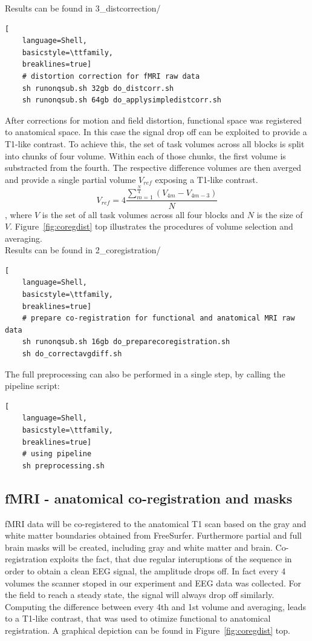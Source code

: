 \documentclass[12pt,a4paper]{scrartcl}
\begin{document}
\noindent Results can be found in 3\_distcorrection/\\
\begin{lstlisting}[
    language=Shell,
    basicstyle=\ttfamily,
    breaklines=true]
    # distortion correction for fMRI raw data
    sh runonqsub.sh 32gb do_distcorr.sh
    sh runonqsub.sh 64gb do_applysimpledistcorr.sh
\end{lstlisting}
After corrections for motion and field distortion, functional space was registered to anatomical space. In this case the signal drop off can be exploited to provide a T1-like contrast. To achieve this, the set of task volumes across all blocks is split into chunks of four volume. Within each of those chunks, the first volume is substracted from the fourth. The respective difference volumes are then averged and provide a single partial volume $V_{ref}$ exposing a T1-like contrast.
\begin{equation}
  V_{ref}=4\frac{\sum_{m=1}^{\frac{N}{4}}(V_{4m}-V_{4m-3})}{N}
\end{equation}
\noindent, where $V$ is the set of all task volumes across all four blocks and $N$ is the size of $V$. Figure~\ref{fig:coregdist} top illustrates the procedures of volume selection and averaging.\\

\noindent Results can be found in 2\_coregistration/\\
\begin{lstlisting}[
    language=Shell,
    basicstyle=\ttfamily,
    breaklines=true]
    # prepare co-registration for functional and anatomical MRI raw data
    sh runonqsub.sh 16gb do_preparecoregistration.sh
    sh do_correctavgdiff.sh
\end{lstlisting}
The full preprocessing can also be performed in a single step, by calling the pipeline script:
\begin{lstlisting}[
    language=Shell,
    basicstyle=\ttfamily,
    breaklines=true]
    # using pipeline
    sh preprocessing.sh
\end{lstlisting}

\subsection{fMRI - anatomical co-registration and masks}
fMRI data will be co-registered to the anatomical T1 scan based on the gray and white matter boundaries obtained from FreeSurfer. Furthermore partial and full brain masks will be created, including gray and white matter and brain. Co-registration exploits the fact, that due regular interuptions of the sequence in order to obtain a clean EEG signal, the amplitude drops off. In fact every 4 volumes the scanner stoped in our experiment and EEG data was collected. For the field to reach a steady state, the signal will always drop off similarly.\\
\noindent Computing the difference between every 4th and 1st volume and averaging, leads to a T1-like contrast, that was used to otimize functional to anatomical registration. A graphical depiction can be found in Figure~\ref{fig:coregdist} top.\\
\end{document}
